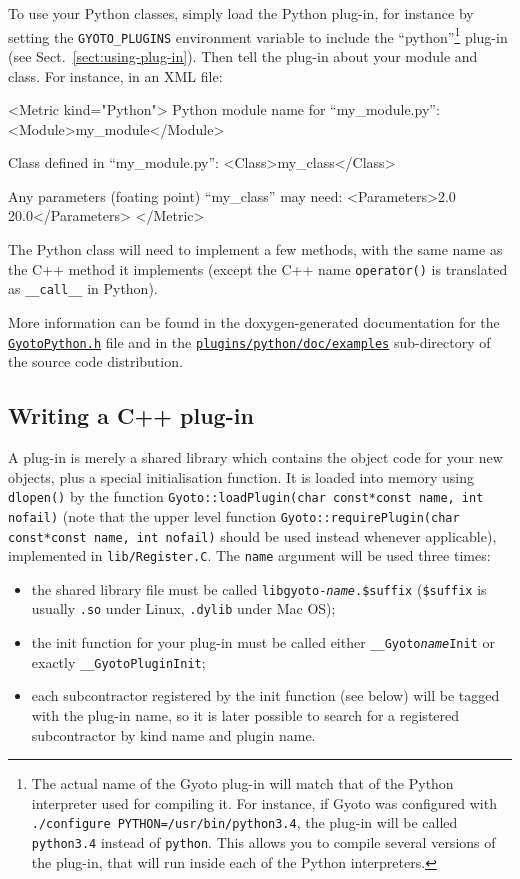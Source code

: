 \documentclass[a4paper,12pt]{article}
\begin{document}
To use your Python classes, simply load the Python plug-in, for
instance by setting the \texttt{GYOTO\_PLUGINS} environment variable
to include the ``python''\footnote{The actual name of the Gyoto plug-in
  will match that of the Python interpreter used for compiling it. For
  instance, if Gyoto was configured with \texttt{./configure
    PYTHON=/usr/bin/python3.4}, the plug-in will be called
  \texttt{python3.4} instead of \texttt{python}. This allows you to
  compile several versions of the plug-in, that will run inside each
  of the Python interpreters.} plug-in (see
Sect.~\ref{sect:using-plug-in}). Then tell the plug-in about your
module and class. For instance, in an XML file:
\begin{code}
  <Metric kind="Python">
   Python module name for ``my_module.py'':
    <Module>my_module</Module>

   Class defined in ``my_module.py'':
    <Class>my_class</Class>

   Any parameters (foating point) ``my_class'' may need:
    <Parameters>2.0 20.0</Parameters>
  </Metric>
\end{code}

The Python class will need to implement a few methods, with the same
name as the C++ method it implements (except the C++ name
\texttt{operator()} is translated as \texttt{\_\_call\_\_} in Python).

More information can be found in the doxygen-generated documentation
for the
\href{https://github.com/gyoto/Gyoto/blob/master/plugins/python/include/GyotoPython.h}{\texttt{GyotoPython.h}}
file and in the
\href{https://github.com/gyoto/Gyoto/tree/master/plugins/python/doc/examples}{\texttt{plugins/python/doc/examples}}
sub-directory of the source code distribution.

\subsection{Writing a C++ plug-in}
\label{sect:plug-in}

A plug-in is merely a shared library which contains the object code
for your new objects, plus a special initialisation function. It is
loaded into memory using \texttt{dlopen()} by the function
\texttt{Gyoto::loadPlugin(char const*const name, int nofail)} (note
that the upper level function \texttt{Gyoto::requirePlugin(char
  const*const name, int nofail)} should be used instead whenever
applicable), implemented in \texttt{lib/Register.C}. The \texttt{name}
argument will be used three times:
\begin{itemize}
\item the shared library file must be called
  \texttt{libgyoto-\emph{name}.\$suffix} (\texttt{\$suffix} is usually
  \texttt{.so} under Linux, \texttt{.dylib} under Mac OS);
\item the init function for your plug-in must be called either
  \texttt{\_\_Gyoto\emph{name}Init} or exactly
  \texttt{\_\_GyotoPluginInit};
\item each subcontractor registered by the init function (see below)
  will be tagged with the plug-in name, so it is later possible to
  search for a registered subcontractor by kind name and plugin name.
\end{itemize}
\end{document}
